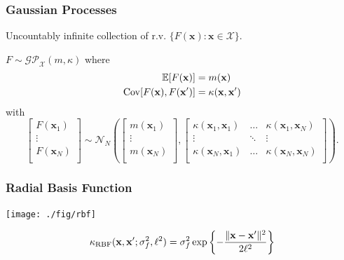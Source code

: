 \documentclass{beamer}
\begin{document}
\begin{frame}
    \frametitle{Gaussian Processes}

    Uncountably infinite collection of r.v.
    $\{ F(\mathbf{x}) : \mathbf{x} \in \mathcal{X} \}$.

    \pause
    \begin{definition}
        $F \sim \mathcal{GP}_{ \mathcal{X}}(m, \kappa)$ where
        \begin{align*}
            \mathbb{E}[F(\mathbf{x})] & = m(\mathbf{x}) \\
            \operatorname{Cov}[F(\mathbf{x}), F(\mathbf{x}')] & = \kappa(\mathbf{x}, \mathbf{x}')
        \end{align*}
        with
        \pause
        \begin{equation*}
            \begin{bmatrix}
                F(\mathbf{x}_1) \\
                \vdots \\
                F(\mathbf{x}_N) \\
            \end{bmatrix}
            \sim
            \mathcal{N}_{N}
            \left(
            \begin{bmatrix}
                    m(\mathbf{x}_1) \\
                    \vdots \\
                    m(\mathbf{x}_N) \\
                \end{bmatrix}
            ,
            \begin{bmatrix}
                    \kappa(\mathbf{x}_1, \mathbf{x}_1) & \dots & \kappa(\mathbf{x}_1, \mathbf{x}_N) \\
                    \vdots & \ddots & \vdots \\
                    \kappa(\mathbf{x}_N, \mathbf{x}_1) & \dots & \kappa(\mathbf{x}_N, \mathbf{x}_N) \\
                \end{bmatrix}
            \right).
        \end{equation*}
    \end{definition}
\end{frame}

\begin{frame}
    \frametitle{Radial Basis Function}
    \begin{center}
        \texttt{[image: ./fig/rbf]}
    \end{center}
    \begin{equation*}
        \kappa_{\mathrm{RBF}}(\mathbf{x}, \mathbf{x}'; \sigma^2_f, \ell^2)
        = 
        \sigma^2_f \exp \left\{ - \frac{\lVert \mathbf{x} - \mathbf{x}' \rVert^2 }{ 2 \ell^2 } \right\}
    \end{equation*}
\end{frame}
\end{document}
